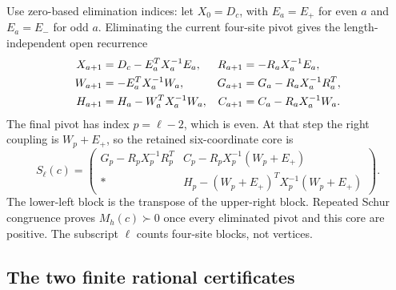 Use zero-based elimination indices: let $X_0=D_c$, with $E_a=E_+$ for
even $a$ and $E_a=E_-$ for odd $a$. Eliminating the current four-site
pivot gives the length-independent open recurrence
\begin{align}
 X_{a+1}&=D_c-E_a^TX_a^{-1}E_a,&
 R_{a+1}&=-R_aX_a^{-1}E_a,\notag\\
 W_{a+1}&=-E_a^TX_a^{-1}W_a,&
 G_{a+1}&=G_a-R_aX_a^{-1}R_a^T,\label{eq:recurrence}\\
 H_{a+1}&=H_a-W_a^TX_a^{-1}W_a,&
 C_{a+1}&=C_a-R_aX_a^{-1}W_a.\notag
\end{align}
The final pivot has index $p=\ell-2$, which is even. At that step the
right coupling is $W_p+E_+$, so the retained six-coordinate core is
\begin{equation}
 S_\ell(c)=\begin{pmatrix}
 G_p-R_pX_p^{-1}R_p^T&C_p-R_pX_p^{-1}(W_p+E_+)\\
 *&H_p-(W_p+E_+)^TX_p^{-1}(W_p+E_+)
 \end{pmatrix}.
 \label{eq:single-core}
\end{equation}
The lower-left block is the transpose of the upper-right block.
Repeated Schur congruence proves $M_h(c)\succ0$ once every eliminated
pivot and this core are positive. The subscript $\ell$ counts four-site
blocks, not vertices.

\subsection{The two finite rational certificates}

